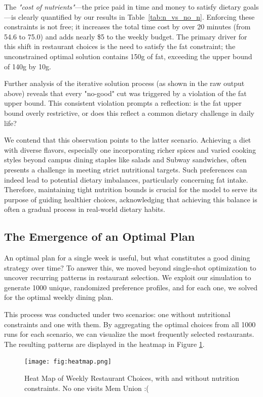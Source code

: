 \documentclass{article}
\begin{document}
The \textit{"cost of nutrients"}—the price paid in time and money to satisfy dietary goals—is clearly quantified by our results in Table~\ref{tab:n_vs_no_n}. Enforcing these constraints is not free; it increases the total time cost by over 20 minutes (from 54.6 to 75.0) and adds nearly \$5 to the weekly budget. The primary driver for this shift in restaurant choices is the need to satisfy the fat constraint; the unconstrained optimal solution contains 150g of fat, exceeding the upper bound of 140g by 10g.

Further analysis of the iterative solution process (as shown in the raw output above) reveals that every "no-good" cut was triggered by a violation of the fat upper bound. This consistent violation prompts a reflection: is the fat upper bound overly restrictive, or does this reflect a common dietary challenge in daily life?

We contend that this observation points to the latter scenario. Achieving a diet with diverse flavors, especially one incorporating richer spices and varied cooking styles beyond campus dining staples like salads and Subway sandwiches, often presents a challenge in meeting strict nutritional targets. Such preferences can indeed lead to potential dietary imbalances, particularly concerning fat intake. Therefore, maintaining tight nutrition bounds is crucial for the model to serve its purpose of guiding healthier choices, acknowledging that achieving this balance is often a gradual process in real-world dietary habits.

\subsection{The Emergence of an Optimal Plan}
An optimal plan for a single week is useful, but what constitutes a good dining strategy over time? To answer this, we moved beyond single-shot optimization to uncover recurring patterns in restaurant selection. We exploit our simulation to generate 1000 unique, randomized preference profiles, and for each one, we solved for the optimal weekly dining plan.

This process was conducted under two scenarios: one without nutritional constraints and one with them. By aggregating the optimal choices from all 1000 runs for each scenario, we can visualize the most frequently selected restaurants. The resulting patterns are displayed in the heatmap in Figure \ref{fig:heatmap}.

\begin{figure}[h]
    \centering
    \texttt{[image: fig:heatmap.png]}
    \caption{Heat Map of Weekly Restaurant Choices, with and without nutrition constraints. No one visits Mem Union :(  }
    \label{fig:heatmap}
\end{figure}
\end{document}
